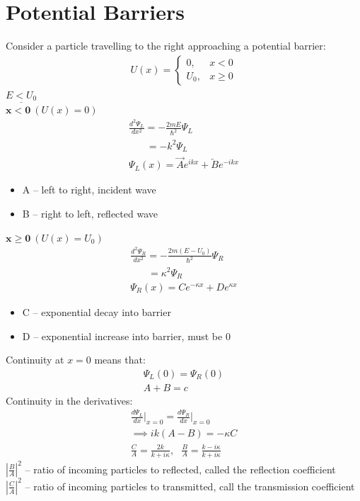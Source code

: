 \documentclass[a4paper, 11pt, fleqn, normalem]{report}
\begin{document}
\section{Potential Barriers}
Consider a particle travelling to the right approaching a potential barrier:
\begin{gather*}
    U(x) =
    \begin{cases}
        0,     & x < 0 \\
        U_{0}, & x \geq 0
    \end{cases}
\end{gather*}
$\underline{E < U_{0}}$ \\
$\mathbf{x < 0}~(U(x) = 0)$
\begin{gather*}
    \frac{d^{2}\Psi_{L}}{dx^{2}} = -\frac{2mE}{\hbar^{2}}\Psi_{L} \\
    ~~~~~~~~ = -k^{2}\Psi_{L} \\
    \Psi_{L}(x) = \overrightarrow{A}e^{ikx} + \overleftarrow{B}e^{-ikx}
\end{gather*}
\begin{itemize}
    \item A -- left to right, incident wave
    \item B -- right to left, reflected wave
\end{itemize}
$\mathbf{x \geq 0}~(U(x) = U_{0})$
\begin{gather*}
    \frac{d^{2}\Psi_{R}}{dx^{2}} = -\frac{2m(E - U_{0})}{\hbar^{2}}\Psi_{R} \\
    ~~~~~~~~ = \kappa^{2}\Psi_{R} \\
    \Psi_{R}(x) = Ce^{-\kappa x} + De^{\kappa x}
\end{gather*}
\begin{itemize}
    \item C -- exponential decay into barrier
    \item D -- exponential increase into barrier, must be 0
\end{itemize}
Continuity at $x = 0$ means that:
\begin{gather*}
    \Psi_{L}(0) = \Psi_{R}(0) \\
    A + B = c
\end{gather*}
Continuity in the derivatives:
\begin{gather*}
    \frac{d\Psi_{L}}{dx}\Big|_{x = 0} = \frac{d\Psi_{R}}{dx}\Big|_{x = 0} \\
    \implies ik(A - B) = -\kappa C \\
    \frac{C}{A} = \frac{2k}{k + i\kappa},~~~\frac{B}{A} = \frac{k - i\kappa}{k + i\kappa}
\end{gather*}
$|\frac{B}{A}|^{2}$ -- ratio of incoming particles to reflected, called the reflection coefficient \\
$|\frac{C}{A}|^{2}$ -- ratio of incoming particles to transmitted, call the transmission coefficient
\end{document}
